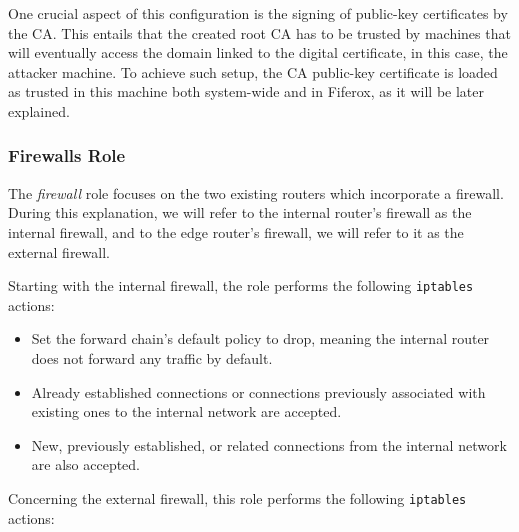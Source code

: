 One crucial aspect of this configuration is the signing of public-key certificates by the CA. This entails that the created root CA has to be trusted by machines that will eventually access the domain linked to the digital certificate, in this case, the attacker machine. To achieve such setup, the CA public-key certificate is loaded as trusted in this machine both system-wide and in Fiferox, as it will be later explained.

\subsubsection{Firewalls Role} \label{sec:ansible_firewalls_role}

The \textit{firewall} role focuses on the two existing routers which incorporate a firewall. During this explanation, we will refer to the internal router's firewall as the internal firewall, and to the edge router's firewall, we will refer to it as the external firewall. 

Starting with the internal firewall, the role performs the following \texttt{iptables} actions:

\begin{itemize}
    \item Set the forward chain's default policy to drop, meaning the internal router does not forward any traffic by default.
    \item Already established connections or connections previously associated with existing ones to the internal network are accepted.
    \item New, previously established, or related connections from the internal network are also accepted.
\end{itemize}

Concerning the external firewall, this role performs the following \texttt{iptables} actions:

